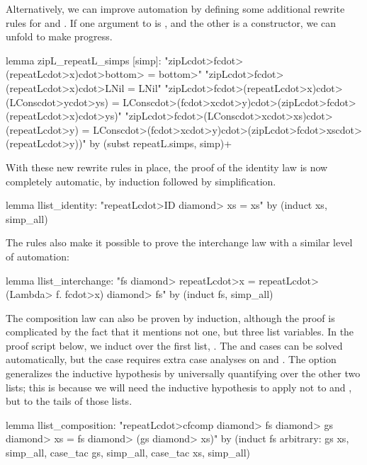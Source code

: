 Alternatively, we can improve automation by defining some additional rewrite rules for  and . If one argument to  is , and the other is a constructor, we can unfold  to make progress.
%
\begin{isacode}
lemma zipL_repeatL_simps [simp]:
  "zipL\<cdot>f\<cdot>(repeatL\<cdot>x)\<cdot>\<bottom> = \<bottom>"
  "zipL\<cdot>f\<cdot>(repeatL\<cdot>x)\<cdot>LNil = LNil"
  "zipL\<cdot>f\<cdot>(repeatL\<cdot>x)\<cdot>(LCons\<cdot>y\<cdot>ys) = LCons\<cdot>(f\<cdot>x\<cdot>y)\<cdot>(zipL\<cdot>f\<cdot>(repeatL\<cdot>x)\<cdot>ys)"
  "zipL\<cdot>f\<cdot>(LCons\<cdot>x\<cdot>xs)\<cdot>(repeatL\<cdot>y) = LCons\<cdot>(f\<cdot>x\<cdot>y)\<cdot>(zipL\<cdot>f\<cdot>xs\<cdot>(repeatL\<cdot>y))"
by (subst repeatL.simps, simp)+
\end{isacode}
%
With these new rewrite rules in place, the proof of the identity law is now completely automatic, by induction followed by simplification.
%
\begin{isacode}
lemma llist_identity: "repeatL\<cdot>ID \<diamond> xs = xs"
  by (induct xs, simp_all)
\end{isacode}
%
The  rules also make it possible to prove the interchange law with a similar level of automation:
%
\begin{isacode}
lemma llist_interchange: "fs \<diamond> repeatL\<cdot>x = repeatL\<cdot>(\<Lambda> f. f\<cdot>x) \<diamond> fs"
  by (induct fs, simp_all)
\end{isacode}

The composition law  can also be proven by induction, although the proof is complicated by the fact that it mentions not one, but three list variables. In the proof script below, we induct over the first list, . The  and  cases can be solved automatically, but the  case requires extra case analyses on  and . The  option generalizes the inductive hypothesis by universally quantifying over the other two lists; this is because we will need the inductive hypothesis to apply not to  and , but to the tails of those lists.
%
\begin{isacode}
lemma llist_composition: "repeatL\<cdot>cfcomp \<diamond> fs \<diamond> gs \<diamond> xs = fs \<diamond> (gs \<diamond> xs)"
  by (induct fs arbitrary: gs xs, simp_all,
      case_tac gs, simp_all, case_tac xs, simp_all)
\end{isacode}

